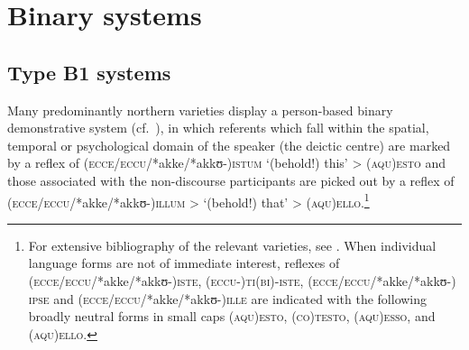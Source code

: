 \documentclass[output=paper]{langsci/langscibook}
\begin{document}
\section{Binary systems}\label{bkm:Ref370483093}

\subsection{Type B1 systems}\label{bkm:Ref370487730}

Many predominantly northern  varieties display a person-based binary
demonstrative system (cf.\ ), in which referents which fall
within the spatial, temporal or psychological domain of the speaker (the
deictic centre) are marked by a reflex of
\textsc{(ecce/eccu/}*akke\textsc{/*}akkʊ-\textsc{)istum} ‘(behold!) this’ >
(\textsc{aqu)esto} and those associated with the non-discourse participants are
picked out by a reflex of
\textsc{(ecce/eccu/}*akke\textsc{/*}akkʊ\nobreakdash-\textsc{)illum} >
‘(behold!) that’ > \textsc{(aqu)ello}.\footnote{For extensive bibliography of
    the relevant varieties, see \citet[879]{Ledgeway:2016ab}. When individual
    language forms are not of immediate interest, reflexes of
    (\textsc{ecce/eccu/*}akke/*akkʊ-)\textsc{iste},
    (\textsc{eccu-)ti(bi)-iste}, \textsc{(ecce/eccu/*}akke/*akkʊ-)\textsc{
    ipse} and \textsc{(ecce/eccu/*}akke/*akkʊ-)\textsc{ille} are indicated with
    the following broadly neutral  forms in small caps
    (\textsc{aqu)esto,} \textsc{(co)testo,} \textsc{(aqu)esso}, and
\textsc{(aqu)ello}.}
\end{document}
